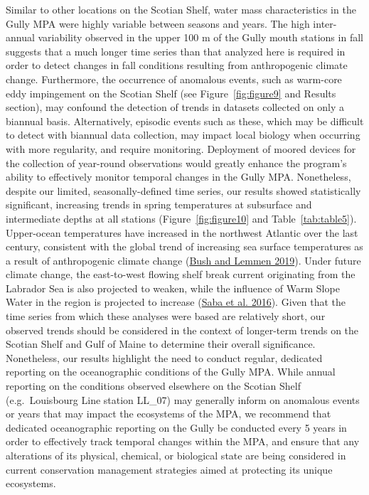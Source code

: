 \documentclass[12pt]{article}\usepackage[]{graphicx}\usepackage[]{color}
\begin{document}
Similar to other locations on the Scotian Shelf, water mass characteristics in the Gully MPA were highly variable between seasons and years. The high inter-annual variability observed in the upper 100 m of the Gully mouth stations in fall suggests that a much longer time series than that analyzed here is required in order to detect changes in fall conditions resulting from anthropogenic climate change. Furthermore, the occurrence of anomalous events, such as warm-core eddy impingement on the Scotian Shelf (see Figure~\ref{fig:figure9} and Results section), may confound the detection of trends in datasets collected on only a biannual basis. Alternatively, episodic events such as these, which may be difficult to detect with biannual data collection, may impact local biology when occurring with more regularity, and require monitoring. Deployment of moored devices for the collection of year-round observations would greatly enhance the program's ability to effectively monitor temporal changes in the Gully MPA. Nonetheless, despite our limited, seasonally-defined time series, our results showed statistically significant, increasing trends in spring temperatures at subsurface and intermediate depths at all stations (Figure~\ref{fig:figure10} and Table~\ref{tab:table5}). Upper-ocean temperatures have increased in the northwest Atlantic over the last century, consistent with the global trend of increasing sea surface temperatures as a result of anthropogenic climate change (\protect\hyperlink{ref-bush_2019}{Bush and Lemmen 2019}). Under future climate change, the east-to-west flowing shelf break current originating from the Labrador Sea is also projected to weaken, while the influence of Warm Slope Water in the region is projected to increase (\protect\hyperlink{ref-saba_2016}{Saba et al. 2016}). Given that the time series from which these analyses were based are relatively short, our observed trends should be considered in the context of longer-term trends on the Scotian Shelf and Gulf of Maine to determine their overall significance. Nonetheless, our results highlight the need to conduct regular, dedicated reporting on the oceanographic conditions of the Gully MPA. While annual reporting on the conditions observed elsewhere on the Scotian Shelf (e.g.~Louisbourg Line station LL\_07) may generally inform on anomalous events or years that may impact the ecosystems of the MPA, we recommend that dedicated oceanographic reporting on the Gully be conducted every 5 years in order to effectively track temporal changes within the MPA, and ensure that any alterations of its physical, chemical, or biological state are being considered in current conservation management strategies aimed at protecting its unique ecosystems.
\end{document}
